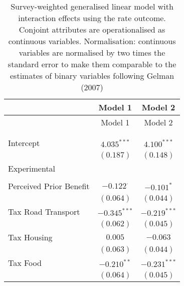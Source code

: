 
\begin{center}
\begin{tiny}
\begin{longtable}{l@{} c@{} c@{}}
\hline
 & Model 1 & Model 2 \\
\hline
\endfirsthead
\hline
 & Model 1 & Model 2 \\
\hline
\endhead
\hline
\endfoot
\hline
\multicolumn{3}{l}{\tiny{$^{***}p<0.001$; $^{**}p<0.01$; $^{*}p<0.05$; $^{\cdot}p<0.1$}}\\
\caption{Survey-weighted generalised linear model with interaction effects using the rate outcome. Conjoint attributes are operationalised as continuous variables. Normalisation: continuous variables are normalised by two times 
               the standard error to make them comparable to the estimates of binary variables following Gelman (2007)}
\label{table:weighted_interactions_exp_continous}
\endlastfoot \\
Intercept                                                 & $4.035^{***}$    & $4.100^{***}$    \\
                                                          & $(0.187)$        & $(0.148)$        \\
Experimental                                              &                  &                  \\
                                                          &                  &                  \\
\quad Perceived Prior Benefit                             & $-0.122^{\cdot}$ & $-0.101^{*}$     \\
                                                          & $(0.064)$        & $(0.044)$        \\
\quad Tax Road Transport                                  & $-0.345^{***}$   & $-0.219^{***}$   \\
                                                          & $(0.062)$        & $(0.045)$        \\
\quad Tax Housing                                         & $0.005$          & $-0.063$         \\
                                                          & $(0.063)$        & $(0.044)$        \\
\quad Tax Food                                            & $-0.210^{**}$    & $-0.231^{***}$   \\
                                                          & $(0.064)$        & $(0.045)$        \\

\end{longtable}
\end{tiny}
\end{center}
